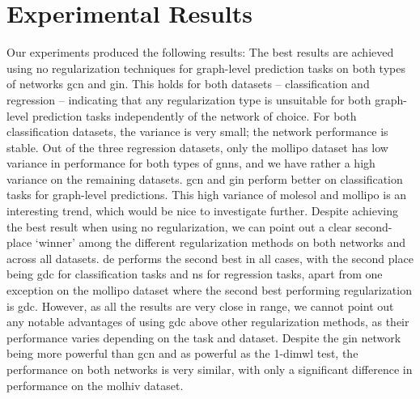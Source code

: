 \section{Experimental Results}
\label{sec:eval:results}

Our experiments produced the following results:
The best results are achieved using no regularization techniques for graph-level prediction tasks on both types of networks \ac{gcn} and \ac{gin}.
This holds for both datasets -- classification and regression -- indicating that any regularization type is unsuitable for both graph-level prediction tasks independently of the network of choice.
For both classification datasets, the variance is very small; the network performance is stable. Out of the three regression datasets, only the mollipo dataset has low variance in performance for both types of \acp{gnn}, and we have rather a high variance on the remaining datasets.
\Ac{gcn} and \ac{gin} perform better on classification tasks for graph-level predictions. This high variance of molesol and mollipo is an interesting trend, which would be nice to investigate further.
Despite achieving the best result when using no regularization, we can point out a clear second-place `winner' among the different regularization methods on both networks and across all datasets.
\Ac{de} performs the second best in all cases, with the second place being \ac{gdc} for classification tasks and \ac{ns} for regression tasks, apart from one exception on the mollipo dataset where the second best performing regularization is \ac{gdc}.
However, as all the results are very close in range, we cannot point out any notable advantages of using \ac{gdc} above other regularization methods, as their performance varies depending on the task and dataset.
Despite the \ac{gin} network being more powerful than \ac{gcn} and as powerful as the 1-dim\ac{wl} test, the performance on both networks is very similar, with only a significant difference in performance on the molhiv dataset.

